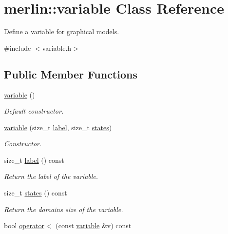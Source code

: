 \hypertarget{classmerlin_1_1variable}{}\section{merlin\+:\+:variable Class Reference}
\label{classmerlin_1_1variable}


Define a variable for graphical models.  




{\ttfamily \#include $<$variable.\+h$>$}

\subsection*{Public Member Functions}
\begin{DoxyCompactItemize}
\item 
\hyperlink{classmerlin_1_1variable_a47355f923edc3674b10564e8306a698b}{variable} ()
\begin{DoxyCompactList}\small\item\em Default constructor. \end{DoxyCompactList}\item 
\hyperlink{classmerlin_1_1variable_ab4bb4ea841ff49be221411759800b95a}{variable} (size\+\_\+t \hyperlink{classmerlin_1_1variable_a696effcebd9f62e16c782f55a85c1a4e}{label}, size\+\_\+t \hyperlink{classmerlin_1_1variable_a74aa029419d99d7acb3e6e9a307f371c}{states})
\begin{DoxyCompactList}\small\item\em Constructor. \end{DoxyCompactList}\item 
size\+\_\+t \hyperlink{classmerlin_1_1variable_a696effcebd9f62e16c782f55a85c1a4e}{label} () const \hypertarget{classmerlin_1_1variable_a696effcebd9f62e16c782f55a85c1a4e}{}\label{classmerlin_1_1variable_a696effcebd9f62e16c782f55a85c1a4e}

\begin{DoxyCompactList}\small\item\em Return the label of the variable. \end{DoxyCompactList}\item 
size\+\_\+t \hyperlink{classmerlin_1_1variable_a74aa029419d99d7acb3e6e9a307f371c}{states} () const \hypertarget{classmerlin_1_1variable_a74aa029419d99d7acb3e6e9a307f371c}{}\label{classmerlin_1_1variable_a74aa029419d99d7acb3e6e9a307f371c}

\begin{DoxyCompactList}\small\item\em Return the domains size of the variable. \end{DoxyCompactList}\item 
bool \hyperlink{classmerlin_1_1variable_ab7b8f9b5325a79284bdbde902bdcad35}{operator$<$} (const \hyperlink{classmerlin_1_1variable}{variable} \&v) const \hypertarget{classmerlin_1_1variable_ab7b8f9b5325a79284bdbde902bdcad35}{}\label{classmerlin_1_1variable_ab7b8f9b5325a79284bdbde902bdcad35}


\end{DoxyCompactItemize}
